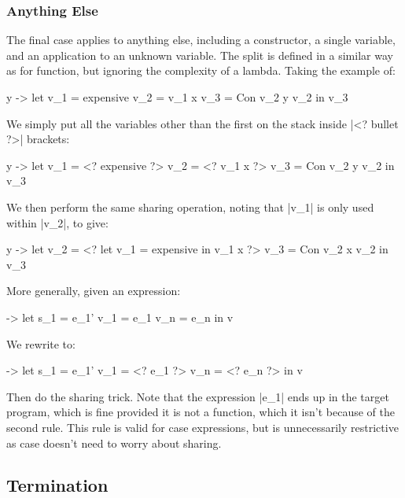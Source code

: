 \documentclass[draft]{sigplanconf}
\begin{document}
\subsubsection{Anything Else}

The final case applies to anything else, including a constructor, a single variable, and an application to an unknown variable. The split is defined in a similar way as for function, but ignoring the complexity of a lambda. Taking the example of:

\begin{code}
\x y ->  let  v_1 = expensive
              v_2 = v_1 x
              v_3 = Con v_2 y v_2
         in   v_3
\end{code}

We simply put all the variables other than the first on the stack inside |<? bullet ?>| brackets:

\begin{code}
\x y -> let v_1 = <? expensive ?>
            v_2 = <? v_1 x ?>
            v_3 = Con v_2 y v_2
        in v_3
\end{code}

We then perform the same sharing operation, noting that |v_1| is only used within |v_2|, to give:

\begin{code}
\x y ->  let  v_2 = <? let v_1 = expensive in v_1 x ?>
              v_3 = Con v_2 x v_2
         in   v_3
\end{code}

More generally, given an expression:

\begin{code}
\free ->  let  s_1 = e_1'
               v_1 = e_1
               v_n = e_n
          in   v
\end{code}

We rewrite to:

\begin{code}
\free ->  let  s_1 = e_1'
               v_1 = <? e_1 ?>
               v_n = <? e_n ?>
          in   v
\end{code}

Then do the sharing trick. Note that the expression |e_1| ends up in the target program, which is fine provided it is not a function, which it isn't because of the second rule. This rule is valid for case expressions, but is unnecessarily restrictive as case doesn't need to worry about sharing.

\subsection{Termination}
\label{sec:term}
\end{document}
